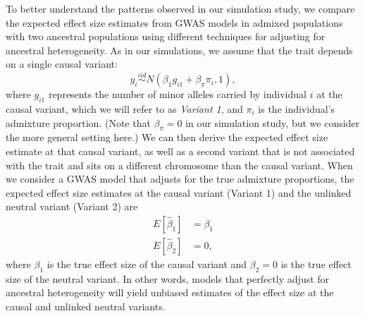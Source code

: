 \documentclass[12pt]{article}
\begin{document}
To better understand the patterns observed in our simulation study, we compare the expected effect size estimates from GWAS models in admixed populations with two ancestral populations using different techniques for adjusting for ancestral heterogeneity.
As in our simulations, we assume that the trait depends on a single causal variant: $$y_i \stackrel{iid}{\sim} N(\beta_1 g_{i1} + \beta_\pi \pi_i, 1),$$ where $g_{i1}$ represents the number of minor alleles carried by individual $i$ at the causal variant, which we will refer to as \textit{Variant 1}, and $\pi_i$ is the individual's admixture proportion.
(Note that $\beta_\pi = 0$ in our simulation study, but we consider the more general setting here.)
We can then derive the expected effect size estimate at that causal variant, as well as a second variant that is not associated with the trait and sits on a different chromosome than the causal variant.
When we consider a GWAS model that adjusts for the true admixture proportions,
the expected effect size estimates at the causal variant (Variant 1) and the unlinked neutral variant (Variant 2) are
$$
\begin{aligned}
E[\hat\beta_1] &= \beta_1 \\
E[\hat\beta_2] &= 0,
\end{aligned}
$$
where $\beta_1$ is the true effect size of the causal variant and $\beta_2 = 0$ is the true effect size of the neutral variant.
In other words, models that perfectly adjust for ancestral heterogeneity will yield unbiased estimates of the effect size at the causal and unlinked neutral variants.
\end{document}
